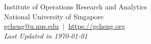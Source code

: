 \documentclass[12pt, a4paper]{article}
\begin{document}




{\par {} \par}
\centering
{\footnotesize Institute of Operations Research and Analytics} \\
{\footnotesize National University of Singapore} \\
{\footnotesize \href{mailto:gcheng@u.nus.edu}{gcheng@u.nus.edu}} $\ \vert \ $ \footnotesize{\href{https://gcheng.org}{https://gcheng.org}} \\
\vspace*{0.5em}
{\footnotesize \textit{Last Updated in \monthyeardate\today}}

\vspace*{1em}
\end{document}
